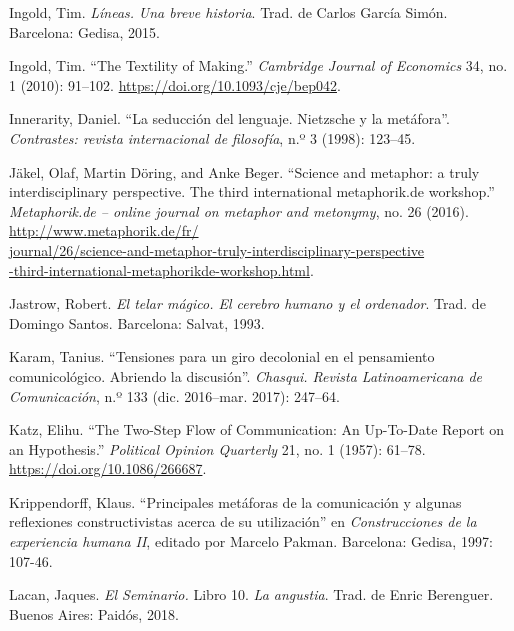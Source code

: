 \documentclass{tufte-handout}
\begin{document}
\begin{hangparas}{.25in}{1}
Ingold, Tim. \emph{Líneas.} \emph{Una breve historia}. Trad. de Carlos
García Simón. Barcelona: Gedisa, 2015.

Ingold, Tim. ``The Textility of Making.'' \emph{Cambridge Journal of
Economics} 34, no. 1 (2010): 91--102.
\url{https://doi.org/10.1093/cje/bep042}.

Innerarity, Daniel. ``La seducción del lenguaje. Nietzsche y la
metáfora''. \emph{Contrastes: revista internacional de filosofía}, n.º 3
(1998): 123--45.

Jäkel, Olaf, Martin Döring, and Anke Beger. ``Science and metaphor: a
truly interdisciplinary perspective. The third international
metaphorik.de workshop.'' \emph{Metaphorik.de -- online journal on
metaphor and metonymy}, no. 26 (2016). \href{http://www.metaphorik.de/fr/journal/26/science-and-metaphor-truly-interdisciplinary-perspective-third-international-metaphorikde-workshop.html}{http://www.metaphorik.de/fr/}\\\hspace{.25in}\href{http://www.metaphorik.de/fr/journal/26/science-and-metaphor-truly-interdisciplinary-perspective-third-international-metaphorikde-workshop.html}{journal/26/science-and-metaphor-truly-interdisciplinary-perspective}\\\hspace{.25in}\href{http://www.metaphorik.de/fr/journal/26/science-and-metaphor-truly-interdisciplinary-perspective-third-international-metaphorikde-workshop.html}{-third-international-metaphorikde-workshop.html}.

Jastrow, Robert. \emph{El telar mágico. El cerebro humano y el
ordenador}. Trad. de Domingo Santos. Barcelona: Salvat, 1993.

Karam, Tanius. ``Tensiones para un giro decolonial en el pensamiento
comunicológico. Abriendo la discusión''. \emph{Chasqui. Revista
Latinoamericana de Comunicación}, n.º 133 (dic. 2016--mar. 2017):
247--64.

Katz, Elihu. ``The Two-Step Flow of Communication: An Up-To-Date Report
on an Hypothesis.'' \emph{Political Opinion Quarterly} 21, no. 1 (1957):
61--78. \url{https://doi.org/10.1086/266687}.

Krippendorff, Klaus. ``Principales metáforas de la comunicación y
algunas reflexiones constructivistas acerca de su utilización'' en
\emph{Construcciones de la experiencia humana II}, editado por Marcelo
Pakman. Barcelona: Gedisa, 1997: 107-46.

Lacan, Jaques. \emph{El Seminario.} Libro 10. \emph{La angustia}. Trad.
de Enric Berenguer. Buenos Aires: Paidós, 2018.


\end{hangparas}
\end{document}
